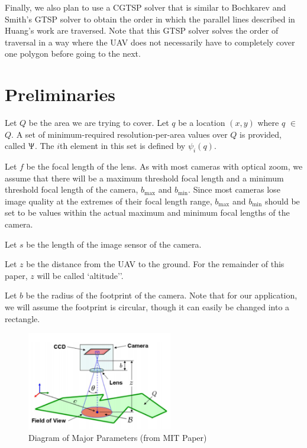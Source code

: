\documentclass[conference]{IEEEtran}
\theoremstyle{plain}%
\begin{document}
Finally, we also plan to use a CGTSP solver that is similar to Bochkarev and Smith's GTSP solver \cite{bochkarevminimizing} to obtain the order in which the parallel lines described in Huang's work are traversed. Note that this GTSP solver solves the order of traversal in a way where the UAV does not necessarily have to completely cover one polygon before going to the next.



\section{Preliminaries} \label{Preliminaries}
Let $Q$ be the area we are trying to cover. Let $q$ be a location $(x,y)$ where $q$ $\in$ $Q$. A set of minimum-required resolution-per-area values over $Q$ is provided, called $\Uppsi$. The $i$th element in this set is defined by $\psi_i(q)$.

Let $f$ be the focal length of the lens. As with most cameras with optical zoom, we assume that there will be a maximum threshold focal length and a minimum threshold focal length of the camera, $b_\textrm{max}$ and $b_\textrm{min}$. Since most cameras lose image quality at the extremes of their focal length range, $b_\textrm{max}$ and $b_\textrm{min}$ should be set to be values within the actual maximum and minimum focal lengths of the camera.

Let $s$ be the length of the image sensor of the camera.

Let $z$ be the distance from the UAV to the ground. For the remainder of this paper, $z$ will be called `altitude''.

Let $b$ be the radius of the footprint of the camera. Note that for our application, we will assume the footprint is circular, though it can easily be changed into a rectangle.

\begin{figure}[!t]
\centering
\includegraphics[width=2.5in]{MIT_pic}
\caption{Diagram of Major Parameters (from MIT Paper)}
\label{major_params}
\end{figure}
\end{document}
